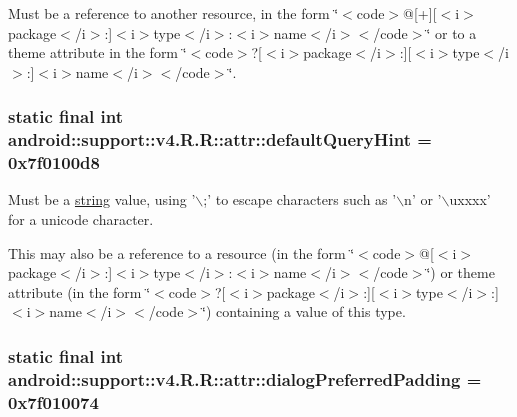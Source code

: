 Must be a reference to another resource, in the form \char`\"{}$<$code$>$@\mbox{[}+\mbox{]}\mbox{[}$<$i$>$package$<$/i$>$:\mbox{]}$<$i$>$type$<$/i$>$:$<$i$>$name$<$/i$>$$<$/code$>$\char`\"{} or to a theme attribute in the form \char`\"{}$<$code$>$?\mbox{[}$<$i$>$package$<$/i$>$:\mbox{]}\mbox{[}$<$i$>$type$<$/i$>$:\mbox{]}$<$i$>$name$<$/i$>$$<$/code$>$\char`\"{}. \hypertarget{classandroid_1_1support_1_1v4_1_1_r_1_1attr_259d105ff5c6843f5ceefa3280373ab7}{
\subsubsection[{defaultQueryHint}]{\setlength{\rightskip}{0pt plus 5cm}static final int android::support::v4.R.R::attr::defaultQueryHint = 0x7f0100d8}}
\label{classandroid_1_1support_1_1v4_1_1_r_1_1attr_259d105ff5c6843f5ceefa3280373ab7}


Must be a \hyperlink{classandroid_1_1support_1_1v4_1_1_r_1_1string}{string} value, using '$\backslash$;' to escape characters such as '$\backslash$n' or '$\backslash$uxxxx' for a unicode character. 

This may also be a reference to a resource (in the form \char`\"{}$<$code$>$@\mbox{[}$<$i$>$package$<$/i$>$:\mbox{]}$<$i$>$type$<$/i$>$:$<$i$>$name$<$/i$>$$<$/code$>$\char`\"{}) or theme attribute (in the form \char`\"{}$<$code$>$?\mbox{[}$<$i$>$package$<$/i$>$:\mbox{]}\mbox{[}$<$i$>$type$<$/i$>$:\mbox{]}$<$i$>$name$<$/i$>$$<$/code$>$\char`\"{}) containing a value of this type. \hypertarget{classandroid_1_1support_1_1v4_1_1_r_1_1attr_43c14a3aaa4878ffead1da7d07f2601f}{
\subsubsection[{dialogPreferredPadding}]{\setlength{\rightskip}{0pt plus 5cm}static final int android::support::v4.R.R::attr::dialogPreferredPadding = 0x7f010074}}
\label{classandroid_1_1support_1_1v4_1_1_r_1_1attr_43c14a3aaa4878ffead1da7d07f2601f}


